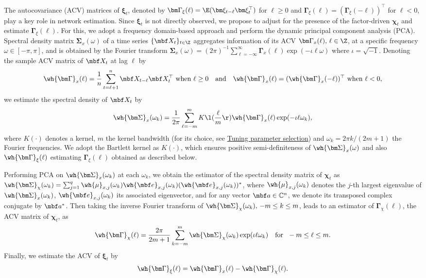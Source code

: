 The autocovariance (ACV) matrices of $\bm\xi_t$, denoted by $\bm\Gamma_\xi(\ell) = \E(\bm\xi_{t - \ell} \bm\xi_t^\top)$ for $\ell \ge 0$ and $\bm\Gamma_\xi(\ell) = (\bm\Gamma_\xi(- \ell))^\top$ for $\ell < 0$, play a key role in network estimation.
Since $\bm\xi_t$ is not directly observed, we propose to adjust for the presence of the factor-driven $\bm\chi_t$ and estimate $\bm\Gamma_\xi(\ell)$.
For this, we adopt a frequency domain-based approach and perform the dynamic principal component analysis (PCA).
Spectral density matrix $\bm\Sigma_x(\omega)$ of a time series $\{\mbf X_t\}_{t \in \Z}$ aggregates information of its ACV $\bm\Gamma_x(\ell), \, \ell \in \Z$, at a specific frequency $\omega \in [-\pi, \pi]$, and is obtained by the Fourier transform $\bm\Sigma_x(\omega) = (2\pi)^{-1} \sum_{\ell = -\infty}^\infty \bm\Gamma_x(\ell) \exp(-\iota \ell \omega)$ where $\iota = \sqrt{ - 1}$.
Denoting the sample ACV matrix of $\mbf X_t$ at lag $\ell$ by
\begin{align*}
\wh{\bm\Gamma}_x(\ell) = \frac{1}{n} \sum_{t = \ell + 1}^n \mbf X_{t - \ell} \mbf X_t^\top
\text{ when } \ell \ge 0 \quad \text{and} \quad
\wh{\bm\Gamma}_x(\ell) = (\wh{\bm\Gamma}_x(-\ell))^\top
\text{ when } \ell < 0,
\end{align*}
we estimate the spectral density of $\mbf X_t$ by
\begin{align}
\label{eq:sigma:hat}
\wh{\bm\Sigma}_x(\omega_k) = \frac{1}{2\pi} \sum_{\ell = -m}^m K\l(\frac{\ell}{m}\r)
\wh{\bm\Gamma}_x(\ell) \exp(-\iota \ell \omega_k), 
\end{align} 
where $K(\cdot)$ denotes a kernel, $m$ the kernel bandwidth (for its choice, see \hyperref[sec:tuning]{Tuning parameter selection}) and $\omega_k = 2\pi k / (2m + 1)$ the Fourier frequencies. 
We adopt the Bartlett kernel as $K(\cdot)$, which ensures positive semi-definiteness of $\wh{\bm\Sigma}_x(\omega)$ and also $\wh{\bm\Gamma}_\xi(\ell)$ estimating $\bm\Gamma_\xi(\ell)$ obtained as described below.

Performing PCA on $\wh{\bm\Sigma}_x(\omega_k)$ at each $\omega_k$, 
we obtain the estimator of the spectral density matrix of $\bm\chi_t$ as $\wh{\bm\Sigma}_\chi(\omega_k) = \sum_{j = 1}^q \wh{\mu}_{x, j}(\omega_k) \wh{\mbf e}_{x, j}(\omega_k) (\wh{\mbf e}_{x, j}(\omega_k))^*$, where $\wh{\mu}_{x, j}(\omega_k)$ denotes the $j$-th largest eigenvalue of $\wh{\bm\Sigma}_x(\omega_k)$, $\wh{\mbf e}_{x, j}(\omega_k)$ its associated eigenvector,
and for any vector $\mbf a \in \mathbb{C}^n$, we denote its transposed complex conjugate by $\mbf a^*$. 
Then taking the inverse Fourier transform of $\wh{\bm\Sigma}_\chi(\omega_k), \, -m \le k \le m$, leads to an estimator of $\bm\Gamma_\chi(\ell)$, the ACV matrix of $\bm\chi_t$, as
\begin{align*}
\wh{\bm\Gamma}_\chi(\ell) = \frac{2\pi}{2m + 1} \sum_{k = -m}^m
\wh{\bm\Sigma}_\chi(\omega_k) \exp(\iota \ell \omega_k) \quad \text{for \ } -m \le \ell \le m.
\end{align*}
Finally, we estimate the ACV of $\bm\xi_t$ by
\begin{align}
\label{eq:acv:xi}
\wh{\bm\Gamma}_\xi(\ell) = \wh{\bm\Gamma}_x(\ell) - \wh{\bm\Gamma}_\chi(\ell).
\end{align}


